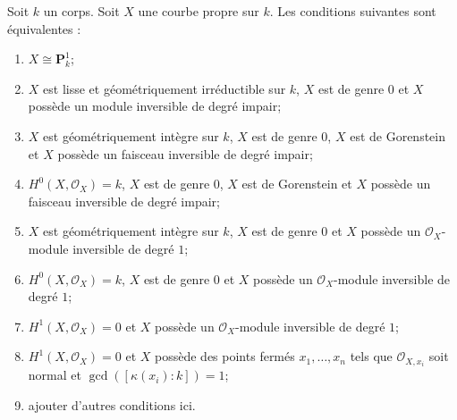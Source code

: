 \begin{proposition} \label{proposition-projective-line} Soit $k$ un corps. Soit $X$ une courbe propre sur $k$. Les conditions suivantes sont équivalentes : \begin{enumerate} \item $X \cong \mathbf{P}^1_k$; \item $X$ est lisse et géométriquement irréductible sur $k$, $X$ est de genre $0$ et $X$ possède un module inversible de degré impair; \item $X$ est géométriquement intègre sur $k$, $X$ est de genre $0$, $X$ est de Gorenstein et $X$ possède un faisceau inversible de degré impair; \item $H^0(X, \mathcal{O}_X) = k$, $X$ est de genre $0$, $X$ est de Gorenstein et $X$ possède un faisceau inversible de degré impair; \item $X$ est géométriquement intègre sur $k$, $X$ est de genre $0$ et $X$ possède un $\mathcal{O}_X$-module inversible de degré $1$; \item $H^0(X, \mathcal{O}_X) = k$, $X$ est de genre $0$ et $X$ possède un $\mathcal{O}_X$-module inversible de degré $1$; \item $H^1(X, \mathcal{O}_X) = 0$ et $X$ possède un $\mathcal{O}_X$-module inversible de degré $1$; \item $H^1(X, \mathcal{O}_X) = 0$ et $X$ possède des points fermés $x_1, \ldots, x_n$ tels que $\mathcal{O}_{X, x_i}$ soit normal et $\gcd([\kappa(x_i) : k]) = 1$; \item ajouter d'autres conditions ici.
\end{enumerate}
\end{proposition}

